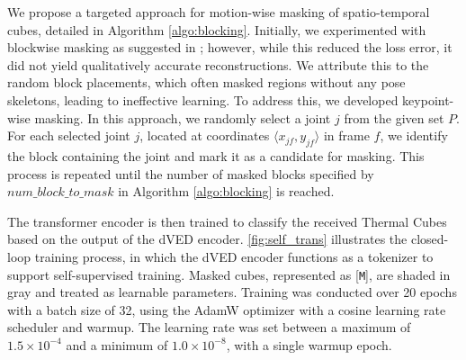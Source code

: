 We propose a targeted approach for motion-wise masking of spatio-temporal cubes, detailed in Algorithm \ref{algo:blocking}. Initially, we experimented with blockwise masking as suggested in \cite{bao2022beit}; however, while this reduced the loss error, it did not yield qualitatively accurate reconstructions. We attribute this to the random block placements, which often masked regions without any pose skeletons, leading to ineffective learning. To address this, we developed keypoint-wise masking. In this approach, we randomly select a joint \( j \) from the given set \( P \). For each selected joint \( j \), located at coordinates \(\langle x_{jf}, y_{jf} \rangle\) in frame \( f \), we identify the block containing the joint and mark it as a candidate for masking. This process is repeated until the number of masked blocks specified by \( num\_block\_to\_mask \) in Algorithm \ref{algo:blocking} is reached.

The transformer encoder is then trained to classify the received Thermal Cubes based on the output of the dVED encoder. \cref{fig:self_trans} illustrates the closed-loop training process, in which the dVED encoder functions as a tokenizer to support self-supervised training. Masked cubes, represented as [\texttt{M}], are shaded in gray and treated as learnable parameters. Training was conducted over 20 epochs with a batch size of 32, using the AdamW optimizer with a cosine learning rate scheduler and warmup. The learning rate was set between a maximum of \(1.5 \times 10^{-4}\) and a minimum of \(1.0 \times 10^{-8}\), with a single warmup epoch.



% 


